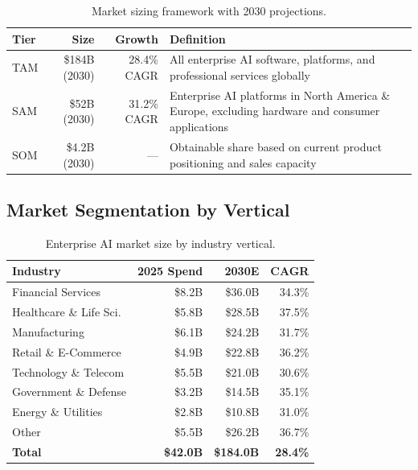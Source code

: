 \documentclass[
    language=english,
    doctype=market-analysis,
    institution=none,
]{../../omnilatex}
\begin{document}
\begin{table}[h]
    \centering
    \begin{tabular}{lrrp{5cm}}
        \toprule
        \textbf{Tier} & \textbf{Size} & \textbf{Growth} & \textbf{Definition} \\
        \midrule
        TAM & \$184B (2030) & 28.4\% CAGR & All enterprise AI software,
            platforms, and professional services globally \\
        SAM & \$52B (2030)  & 31.2\% CAGR & Enterprise AI platforms in
            North America \& Europe, excluding hardware and
            consumer applications \\
        SOM & \$4.2B (2030) & ---  & Obtainable share based on current
            product positioning and sales capacity \\
        \bottomrule
    \end{tabular}
    \caption{Market sizing framework with 2030 projections.}
\end{table}

\subsection{Market Segmentation by Vertical}

\begin{table}[h]
    \centering
    \begin{tabular}{lrrr}
        \toprule
        \textbf{Industry} & \textbf{2025 Spend} & \textbf{2030E} & \textbf{CAGR} \\
        \midrule
        Financial Services     & \$8.2B  & \$36.0B & 34.3\% \\
        Healthcare \& Life Sci. & \$5.8B  & \$28.5B & 37.5\% \\
        Manufacturing          & \$6.1B  & \$24.2B & 31.7\% \\
        Retail \& E-Commerce   & \$4.9B  & \$22.8B & 36.2\% \\
        Technology \& Telecom  & \$5.5B  & \$21.0B & 30.6\% \\
        Government \& Defense  & \$3.2B  & \$14.5B & 35.1\% \\
        Energy \& Utilities    & \$2.8B  & \$10.8B & 31.0\% \\
        Other                  & \$5.5B  & \$26.2B & 36.7\% \\
        \midrule
        \textbf{Total}         & \textbf{\$42.0B} & \textbf{\$184.0B} & \textbf{28.4\%} \\
        \bottomrule
    \end{tabular}
    \caption{Enterprise AI market size by industry vertical.}
\end{table}
\end{document}
